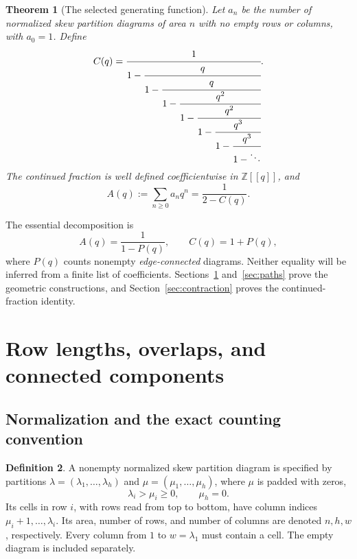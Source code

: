 \documentclass[11pt,letterpaper]{article}
\numberwithin{equation}{section}
\newtheorem{theorem}{Theorem}[section]
\theoremstyle{definition}
\newtheorem{definition}[theorem]{Definition}
\newcommand{\Z}{\mathbb Z}
\begin{document}
\begin{theorem}[The selected generating function]
\label{thm:main}
Let $a_n$ be the number of normalized skew partition diagrams of area $n$
with no empty rows or columns, with $a_0=1$. Define
\begin{equation}
 C(q)=\cfrac{1}{1-\cfrac{q}{1-\cfrac{q}{1-\cfrac{q^2}{1-\cfrac{q^2}{1-
 \cfrac{q^3}{1-\cfrac{q^3}{1-\ddots}}}}}}}.
 \label{eq:mainC}
\end{equation}
The continued fraction is well defined coefficientwise in $\Z[[q]]$, and
\begin{equation}
 A(q):=\sum_{n\ge0}a_nq^n=\frac{1}{2-C(q)}.
 \label{eq:mainA}
\end{equation}
\end{theorem}

The essential decomposition is
\begin{equation}
 \boxed{\quad A(q)=\frac{1}{1-P(q)},\qquad C(q)=1+P(q),\quad}
 \label{eq:proofplan}
\end{equation}
where $P(q)$ counts nonempty \emph{edge-connected} diagrams. Neither equality
will be inferred from a finite list of coefficients. Sections~\ref{sec:rows}
and~\ref{sec:paths} prove the geometric constructions, and
Section~\ref{sec:contraction} proves the continued-fraction identity.

\section{Row lengths, overlaps, and connected components}
\label{sec:rows}

\subsection{Normalization and the exact counting convention}

\begin{definition}
A nonempty normalized skew partition diagram is specified by partitions
$\lambda=(\lambda_1,\ldots,\lambda_h)$ and
$\mu=(\mu_1,\ldots,\mu_h)$, where $\mu$ is padded with zeros,
\[
 \lambda_i>\mu_i\ge0,\qquad \mu_h=0.
\]
Its cells in row $i$, with rows read from top to bottom, have column indices
$\mu_i+1,\ldots,\lambda_i$. Its area, number of rows, and number of columns
are denoted $n,h,w$, respectively. Every column from $1$ to $w=\lambda_1$
must contain a cell. The empty diagram is included separately.
\end{definition}
\end{document}
